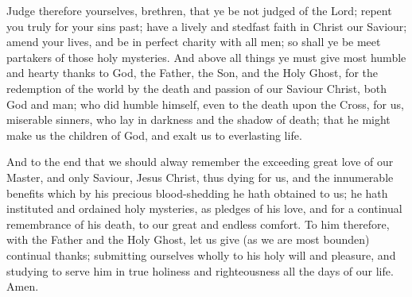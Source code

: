 \smallskip


\medskip



Judge therefore yourselves, brethren, that ye be not judged of the Lord; repent you truly for your sins past; have a lively and stedfast faith in Christ our Saviour; amend your lives, and be in perfect charity with all men; so shall ye be meet partakers of those holy mysteries. And above all things ye must give most humble and hearty thanks to God, the Father, the Son, and the Holy Ghost, for the redemption of the world by the death and passion of our Saviour Christ, both God and man; who did humble himself, even to the death upon the Cross, for us, miserable sinners, who lay in darkness and the shadow of death; that he might make us the children of God, and exalt us to everlasting life.

And to the end that we should alway remember the exceeding great love of our Master, and only Saviour, Jesus Christ, thus dying for us, and the innumerable benefits which by his precious blood-shedding he hath obtained to us; he hath instituted and ordained holy mysteries, as pledges of his love, and for a continual remembrance of his death, to our great and endless comfort. To him therefore, with the Father and the Holy Ghost, let us give (as we are most bounden) continual thanks; submitting ourselves wholly to his holy will and pleasure, and studying to serve him in true holiness and righteousness all the days of our life. Amen.


